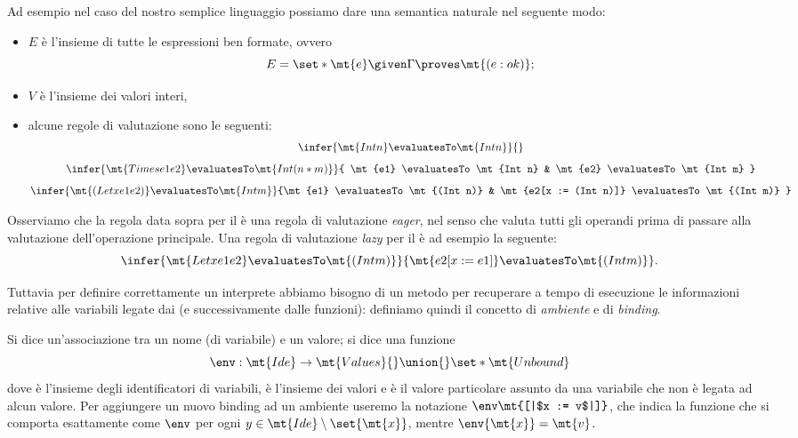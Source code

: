 Ad esempio nel caso del nostro semplice linguaggio possiamo dare una semantica naturale nel seguente modo:
\begin{itemize}
    \item $E$ è l'insieme di tutte le espressioni ben formate, ovvero \[
        E = \set*{\mt{e} \given \Gamma \proves \mt{(e : ok)}};
    \]
    \item $V$ è l'insieme dei valori interi,
    \item alcune regole di valutazione sono le seguenti: \begin{gather*}
        \infer{
            \mt{Int n} \evaluatesTo \mt{Int n}
        }{}\\[5pt]
        \infer{
            \mt{Times e1 e2} \evaluatesTo \mt{Int (n*m)}
        }{
            \mt{e1} \evaluatesTo \mt{Int n} & \mt{e2} \evaluatesTo \mt{Int m}
        }\\[5pt]
        \infer{
            \mt{(Let x e1 e2)} \evaluatesTo \mt{Int m}
        }{\mt{e1} \evaluatesTo \mt{(Int n)} & \mt{e2[x := (Int n)]} \evaluatesTo \mt{(Int m)}
        }
    \end{gather*}
\end{itemize}

Osserviamo che la regola data sopra per il  è una regola di valutazione \emph{eager}, nel senso che valuta tutti gli operandi prima di passare alla valutazione dell'operazione principale. Una regola di valutazione \emph{lazy} per il  è ad esempio la seguente: \[
    \infer{\mt{Let x e1 e2} \evaluatesTo \mt{(Int m)}}{\mt{e2[x := e1]} \evaluatesTo \mt{(Int m)}}.    
\]

Tuttavia per definire correttamente un interprete abbiamo bisogno di un metodo per recuperare a tempo di esecuzione le informazioni relative alle variabili legate dai  (e successivamente dalle funzioni): definiamo quindi il concetto di \emph{ambiente} e di \emph{binding}.

Si dice  un'associazione tra un nome (di variabile) e un valore; si dice  una funzione \[
    \env : \mt{Ide} \to \mt{Values} {}\union{} \set*{\mt{Unbound}}
\] dove  è l'insieme degli identificatori di variabili,  è l'insieme dei valori e  è il valore particolare assunto da una variabile che non è legata ad alcun valore. Per aggiungere un nuovo binding ad un ambiente useremo la notazione $\env\mt{[|$x := v$|]}$, che indica la funzione che si comporta esattamente come $\env$ per ogni $y \in \mt{Ide} \setminus \set{\mt{x}}$, mentre $\env{\mt{x}} = \mt{v}$.

